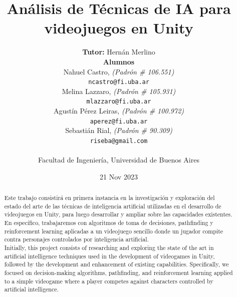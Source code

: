 \documentclass[a4paper]{article}
\begin{document}
\begin{titlepage}

    \title{
        \textbf{Análisis de Técnicas de IA para \\ videojuegos en Unity} \\[2.5ex]
    }

    \author{
        \textbf{Tutor:} Hernán Merlino \\[2.5ex]
        \textbf{Alumnos} \\[2.5ex]
        Nahuel Castro, \textit{(Padrón \# 106.551)} \\ \texttt{ ncastro@fi.uba.ar } \\[2.5ex]
        Melina Lazzaro, \textit{(Padrón \# 105.931)} \\ \texttt{ mlazzaro@fi.uba.ar } \\[2.5ex]
        Agustín Pérez Leiras, \textit{(Padrón \# 100.972)} \\ \texttt{ aperez@fi.uba.ar } \\[2.5ex]
        Sebastián Rial, \textit{(Padrón \# 90.309)} \\  \texttt{ riseba@gmail.com } \\[2.5ex]
        \\[2.5ex]
        \normalsize{Facultad de Ingeniería, Universidad de Buenos Aires} \\
    }

    \date{21 Nov 2023}

\end{titlepage}

\maketitle

\newpage

\begin{abstract}

    Este trabajo consistirá en primera instancia en la investigación y exploración del estado del arte de las técnicas de inteligencia artificial utilizadas en el desarrollo de videojuegos en Unity, para luego desarrollar y ampliar sobre las capacidades existentes. En específico, trabajaremos con algoritmos de toma de decisiones, pathfinding y reinforcement learning aplicadas a un videojuego sencillo donde un jugador compite contra personajes controlados por inteligencia artificial.\\

    Initially, this project consists of researching and exploring the state of the art in artificial intelligence techniques used in the development of videogames in Unity, followed by the development and enhancement of existing capabilities. Specifically, we focused on decision-making algorithms, pathfinding, and reinforcement learning applied to a simple videogame where a player competes against characters controlled by artificial intelligence.

\end{abstract}
\end{document}
